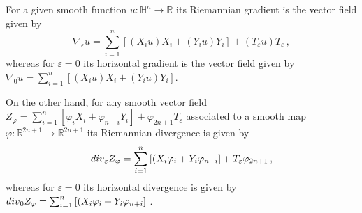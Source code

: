 \documentclass[10pt]{amsart}
\numberwithin{equation}{section}
\theoremstyle{definition}
\newcommand{\R}{{\mathbb R}}
\newcommand{\eps}{\varepsilon}
\newcommand{\eT}{T_{\eps}}
\begin{document}
For a given smooth function $u:\mathbb{H}^n \to \R$ its Riemannian
gradient is the vector field given by
$$\nabla_{\eps}u = \sum_{i=1}^{n}\left[(X_i u)X_i + (Y_i u)Y_i\right] + (\eT u) \eT \, ,$$
whereas for $\varepsilon=0$ its horizontal gradient is the vector field given by $\nabla_0 u=  \sum_{i=1}^{n}\left[(X_i u)X_i + (Y_i u)Y_i\right] $. 

On the other hand, for any smooth vector field $Z_\varphi=\sum_{i=1}^n \left[ \varphi_i X_i + \varphi_{n+i} Y_i \right]+ \varphi_{2n+1} T_\varepsilon$ associated to a smooth map $\varphi:\mathbb{R}^{2n+1} \to \mathbb{R}^{2n+1}$  its Riemannian divergence is given by
$${\rm div}_{\eps} Z_\varphi = \sum_{i=1}^{n}\left[(X_i \varphi_i + Y_i \varphi_{n+i}\right] + \eT  \varphi_{2n+1} \, ,$$
whereas for $\varepsilon=0$ its horizontal divergence is given by ${\rm div}_{0} Z_\varphi = \sum_{i=1}^{n}\left[(X_i \varphi_i + Y_i \varphi_{n+i}\right] $ . 
\end{document}
